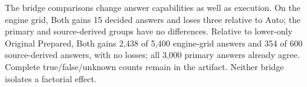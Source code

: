 The bridge comparisons change answer capabilities as well as execution. On the engine grid, Both gains 15 decided answers and loses three relative to Auto; the primary and source-derived groups have no differences. Relative to lower-only Original Prepared, Both gains 2,438 of 5,400 engine-grid answers and 354 of 600 source-derived answers, with no losses; all 3,000 primary answers already agree. Complete true/false/unknown counts remain in the artifact. Neither bridge isolates a factorial effect.



